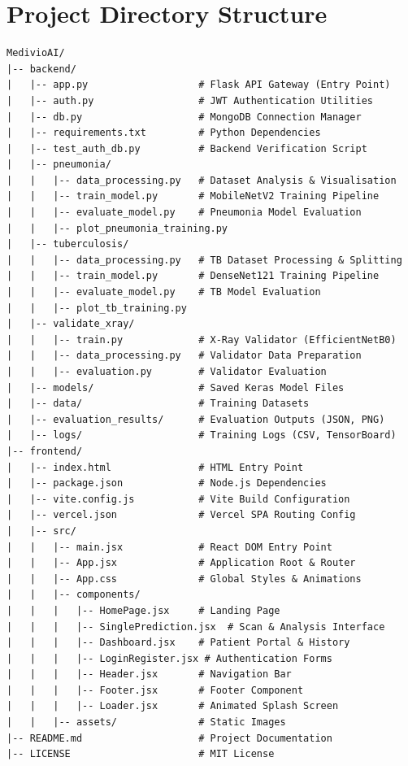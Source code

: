 \documentclass[12pt, a4paper, oneside]{report}
\begin{document}
\appendix
\chapter{Project Directory Structure}
\label{app:structure}

\begin{lstlisting}[language={}, caption={Complete project directory structure}, label={lst:directory}]
MedivioAI/
|-- backend/
|   |-- app.py                   # Flask API Gateway (Entry Point)
|   |-- auth.py                  # JWT Authentication Utilities
|   |-- db.py                    # MongoDB Connection Manager
|   |-- requirements.txt         # Python Dependencies
|   |-- test_auth_db.py          # Backend Verification Script
|   |-- pneumonia/
|   |   |-- data_processing.py   # Dataset Analysis & Visualisation
|   |   |-- train_model.py       # MobileNetV2 Training Pipeline
|   |   |-- evaluate_model.py    # Pneumonia Model Evaluation
|   |   |-- plot_pneumonia_training.py
|   |-- tuberculosis/
|   |   |-- data_processing.py   # TB Dataset Processing & Splitting
|   |   |-- train_model.py       # DenseNet121 Training Pipeline
|   |   |-- evaluate_model.py    # TB Model Evaluation
|   |   |-- plot_tb_training.py
|   |-- validate_xray/
|   |   |-- train.py             # X-Ray Validator (EfficientNetB0)
|   |   |-- data_processing.py   # Validator Data Preparation
|   |   |-- evaluation.py        # Validator Evaluation
|   |-- models/                  # Saved Keras Model Files
|   |-- data/                    # Training Datasets
|   |-- evaluation_results/      # Evaluation Outputs (JSON, PNG)
|   |-- logs/                    # Training Logs (CSV, TensorBoard)
|-- frontend/
|   |-- index.html               # HTML Entry Point
|   |-- package.json             # Node.js Dependencies
|   |-- vite.config.js           # Vite Build Configuration
|   |-- vercel.json              # Vercel SPA Routing Config
|   |-- src/
|   |   |-- main.jsx             # React DOM Entry Point
|   |   |-- App.jsx              # Application Root & Router
|   |   |-- App.css              # Global Styles & Animations
|   |   |-- components/
|   |   |   |-- HomePage.jsx     # Landing Page
|   |   |   |-- SinglePrediction.jsx  # Scan & Analysis Interface
|   |   |   |-- Dashboard.jsx    # Patient Portal & History
|   |   |   |-- LoginRegister.jsx # Authentication Forms
|   |   |   |-- Header.jsx       # Navigation Bar
|   |   |   |-- Footer.jsx       # Footer Component
|   |   |   |-- Loader.jsx       # Animated Splash Screen
|   |   |-- assets/              # Static Images
|-- README.md                    # Project Documentation
|-- LICENSE                      # MIT License
\end{lstlisting}
\end{document}
